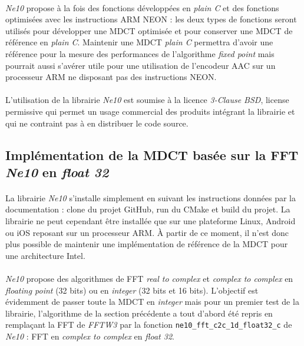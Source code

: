 \documentclass{article}
\begin{document}
    \paragraph{}
    \emph{Ne10} propose à la fois des fonctions développées en \emph{plain C} et des fonctions optimisées avec les instructions ARM NEON : les deux types de fonctions seront utilisés pour développer une MDCT optimisée et pour conserver une MDCT de référence en \emph{plain C}. Maintenir une MDCT \emph{plain C} permettra d'avoir une référence pour la mesure des performances de l'algorithme \emph{fixed point} mais pourrait aussi s'avérer utile pour une utilisation de l'encodeur AAC sur un processeur ARM ne disposant pas des instructions NEON.

    \paragraph{}
    L'utilisation de la librairie \emph{Ne10} est soumise à la licence \emph{3-Clause BSD}, license permissive qui permet un usage commercial des produits intégrant la librairie et qui ne contraint pas à en distribuer le code source\cite{BSD}.

    \subsection{Implémentation de la MDCT basée sur la FFT \emph{Ne10} en \emph{float 32}}
    \paragraph{}
    La librairie \emph{Ne10} s'installe simplement en suivant les instructions données par la documentation : clone du projet GitHub, run du CMake et build du projet\cite{Ne10}. La librairie ne peut cependant être installée que sur une plateforme Linux, Android ou iOS reposant sur un processeur ARM. À partir de ce moment, il n'est donc plus possible de maintenir une implémentation de référence de la MDCT pour une architecture Intel.

    \paragraph{}
    \emph{Ne10} propose des algorithmes de FFT \emph{real to complex} et \emph{complex to complex} en \emph{floating point} (32 bits) ou en \emph{integer} (32 bits et 16 bits). L'objectif est évidemment de passer toute la MDCT en \emph{integer} mais pour un premier test de la librairie, l'algorithme de la section précédente a tout d'abord été repris en remplaçant la FFT de \emph{FFTW3} par la fonction \texttt{ne10\_fft\_c2c\_1d\_float32\_c} de \emph{Ne10} : FFT en \emph{complex to complex} en \emph{float 32}.
\end{document}
